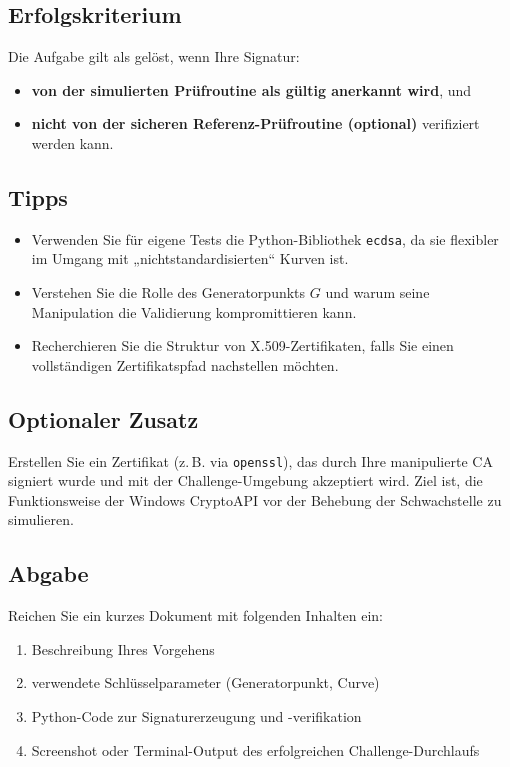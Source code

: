 \documentclass{article}
\begin{document}
\subsection{Erfolgskriterium}

Die Aufgabe gilt als gelöst, wenn Ihre Signatur:

\begin{itemize}
    \item \textbf{von der simulierten Prüfroutine als gültig anerkannt wird}, und
    \item \textbf{nicht von der sicheren Referenz-Prüfroutine (optional)} verifiziert werden kann.
\end{itemize}

\subsection{Tipps}

\begin{itemize}
    \item Verwenden Sie für eigene Tests die Python-Bibliothek \texttt{ecdsa}, da sie flexibler im Umgang mit „nichtstandardisierten“ Kurven ist.
    \item Verstehen Sie die Rolle des Generatorpunkts $G$ und warum seine Manipulation die Validierung kompromittieren kann.
    \item Recherchieren Sie die Struktur von X.509-Zertifikaten, falls Sie einen vollständigen Zertifikatspfad nachstellen möchten.
\end{itemize}

\subsection{Optionaler Zusatz}

Erstellen Sie ein Zertifikat (z. B. via \texttt{openssl}), das durch Ihre manipulierte CA signiert wurde und mit der Challenge-Umgebung akzeptiert wird. Ziel ist, die Funktionsweise der Windows CryptoAPI vor der Behebung der Schwachstelle zu simulieren.

\subsection{Abgabe}

Reichen Sie ein kurzes Dokument mit folgenden Inhalten ein:

\begin{enumerate}
    \item Beschreibung Ihres Vorgehens
    \item verwendete Schlüsselparameter (Generatorpunkt, Curve)
    \item Python-Code zur Signaturerzeugung und -verifikation
    \item Screenshot oder Terminal-Output des erfolgreichen Challenge-Durchlaufs
\end{enumerate}
\end{document}
